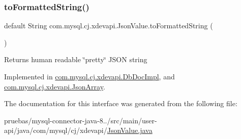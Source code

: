 \subsubsection{\texorpdfstring{to\+Formatted\+String()}{toFormattedString()}}
{\footnotesize\ttfamily default String com.\+mysql.\+cj.\+xdevapi.\+Json\+Value.\+to\+Formatted\+String (\begin{DoxyParamCaption}{ }\end{DoxyParamCaption})}

\begin{DoxyReturn}{Returns}
human readable \char`\"{}pretty\char`\"{} J\+S\+ON string 
\end{DoxyReturn}


Implemented in \mbox{\hyperlink{classcom_1_1mysql_1_1cj_1_1xdevapi_1_1_db_doc_impl_a4880b999d135b6a871d605b523fc1529}{com.\+mysql.\+cj.\+xdevapi.\+Db\+Doc\+Impl}}, and \mbox{\hyperlink{classcom_1_1mysql_1_1cj_1_1xdevapi_1_1_json_array_a8a735ca15493e8154b46976ffb56204e}{com.\+mysql.\+cj.\+xdevapi.\+Json\+Array}}.



The documentation for this interface was generated from the following file\+:\begin{DoxyCompactItemize}
\item 
pruebas/mysql-\/connector-\/java-\/8../src/main/user-\/api/java/com/mysql/cj/xdevapi/\mbox{\hyperlink{_json_value_8java}{Json\+Value.\+java}}\end{DoxyCompactItemize}
